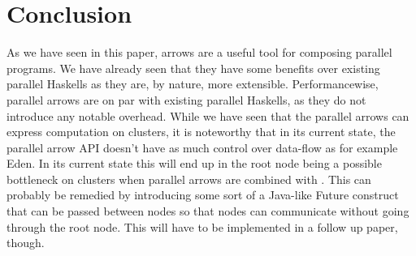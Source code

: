 \section{Conclusion}
As we have seen in this paper, arrows are a useful tool for composing parallel programs. We have already seen that they have some benefits over existing parallel Haskells as they are, by nature, more extensible. Performancewise, parallel arrows are on par with existing parallel Haskells, as they do not introduce any notable overhead. While we have seen that the parallel arrows can express computation on clusters, it is noteworthy that in its current state, the parallel arrow API doesn't have as much control over data-flow as for example Eden. In its current state this will end up in the root node being a possible bottleneck on clusters when parallel arrows are combined with \code{>>>}. This can probably be remedied by introducing some sort of a Java-like Future construct that can be passed between nodes so that nodes can communicate without going through the root node. This will have to be implemented in a follow up paper, though.
